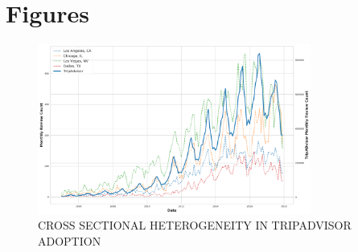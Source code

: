 \documentclass[mksc,blindrev]{informs3} %
\begin{document}
\section*{Figures} \label{sec:fig}

 
 

 


\begin{figure}[hp]
\caption{CROSS SECTIONAL HETEROGENEITY IN TRIPADVISOR ADOPTION}
 \label{fig:taadopt}
 \centering
 \includegraphics[width=0.8\textwidth,height=\textheight,keepaspectratio]{./Figures/TA_Adoption.png}
\end{figure}
\clearpage
\end{document}
